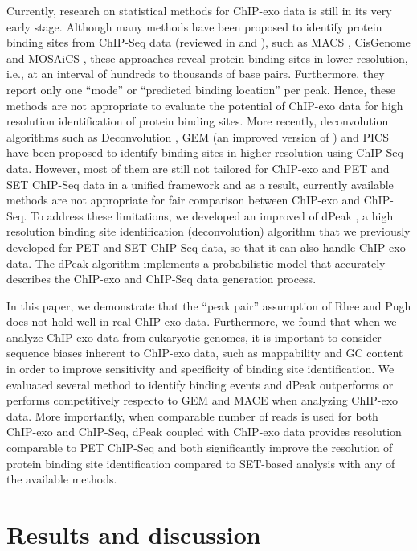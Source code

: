 \documentclass{bmcart}\usepackage[]{graphicx}\usepackage[]{color}
\begin{document}
Currently, research on statistical methods for ChIP-exo data is still
in its very early stage. Although many methods have been proposed to
identify protein binding sites from ChIP-Seq data (reviewed in
\cite{evaluation} and \cite{computation}), such as MACS \cite{macs},
CisGenome \cite{cisgenome} and MOSAiCS \cite{mosaics}, these
approaches reveal protein binding sites in lower resolution, i.e., at
an interval of hundreds to thousands of base pairs. Furthermore, they
report only one ``mode'' or ``predicted binding location'' per
peak. Hence, these methods are not appropriate to evaluate the
potential of ChIP-exo data for high resolution identification of
protein binding sites. More recently, deconvolution algorithms such as
Deconvolution \cite{csdeconv}, GEM \cite{gem} (an improved version of
\cite{gps}) and PICS \cite{pics} have been proposed to identify
binding sites in higher resolution using ChIP-Seq data. However, most
of them are still not tailored for ChIP-exo and PET and SET ChIP-Seq
data in a unified framework and as a result, currently available
methods are not appropriate for fair comparison between ChIP-exo and
ChIP-Seq. To address these limitations, we developed an improved of
dPeak \cite{dpeak}, a high resolution binding site identification
(deconvolution) algorithm that we previously developed for PET and SET
ChIP-Seq data, so that it can also handle ChIP-exo data. The dPeak
algorithm implements a probabilistic model that accurately describes
the ChIP-exo and ChIP-Seq data generation process.

In this paper, we demonstrate that the ``peak pair'' assumption of
Rhee and Pugh \cite{exo1} does not hold well in real ChIP-exo
data. Furthermore, we found that when we analyze ChIP-exo data from
eukaryotic genomes, it is important to consider sequence biases
inherent to ChIP-exo data, such as mappability and GC content in order
to improve sensitivity and specificity of binding site
identification. We evaluated several method to identify binding events
and dPeak outperforms or performs competitively respecto to GEM and
MACE when analyzing ChIP-exo data. More importantly, when comparable
number of reads is used for both ChIP-exo and ChIP-Seq, dPeak coupled
with ChIP-exo data provides resolution comparable to PET ChIP-Seq and
both significantly improve the resolution of protein binding site
identification compared to SET-based analysis with any of the
available methods.

\newpage

\section{Results and discussion}
\label{sec:results}
\end{document}
